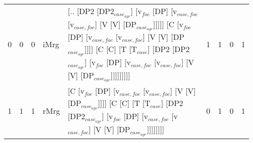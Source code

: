 \begin{tabularx}{\linewidth}{rrrlXrrrr}
   0 &       0 &   0 & iMrg & [.. [DP2 [DP2$_{case_{agr}}$] [v$_{foc}$ [DP] [v$_{case,foc}$ [v$_{case,foc}$] [V [V] [DP$_{case_{agr}}$]]]]] [C [v$_{foc}$ [DP] [v$_{case,foc}$ [v$_{case,foc}$] [V [V] [DP$_{case_{agr}}$]]]] [C [C] [T [T$_{case}$] [DP2 [DP2$_{case_{agr}}$] [v$_{foc}$ [DP] [v$_{case,foc}$ [v$_{case,foc}$] [V [V] [DP$_{case_{agr}}$]]]]]]]]]              &             1 &             1 &                  0 &          1 \\
   1 &       1 &   1 & rMrg & [C [v$_{foc}$ [DP] [v$_{case,foc}$ [v$_{case,foc}$] [V [V] [DP$_{case_{agr}}$]]]] [C [C] [T [T$_{case}$] [DP2 [DP2$_{case_{agr}}$] [v$_{foc}$ [DP] [v$_{case,foc}$ [v$_{case,foc}$] [V [V] [DP$_{case_{agr}}$]]]]]]]]                                                                                                     &             0 &             1 &                  0 &          1 \\
\hline
\end{tabularx}\endgroup\\


